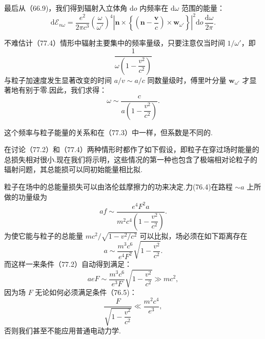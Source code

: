 最后从（66.9)，我们得到辐射入立体角 $\mathrm{d}o$ 内频率在 $\mathrm{d}\omega$ 范围的能量：
\begin{equation}
  \mathrm{d}\mathcal{E}_{n\omega}=\frac{e^2}{2\pi c^3}\left(\frac{\omega}{\omega'}\right)^{\!4}
  \left|\boldsymbol{n}\times\left\{\left(\boldsymbol{n}-\frac{\boldsymbol{v}}{c}\right)\times\boldsymbol{w}_{\omega'}\right\}\right|^2
  \mathrm{d}o\,\frac{\mathrm{d}\omega}{2\pi}.
\end{equation}

不难估计（77.4）情形中辐射主要集中的频率量级，只要注意仅当时间 $1/\omega'$，即
\begin{equation*}
  \frac{1}{\omega\left(1-\dfrac{v^2}{c^2}\right)}
\end{equation*}
与粒子加速度发生显著改变的时间 $a/v\sim a/c$ 同数量级时，傅里叶分量 $\boldsymbol{w}_{\omega'}$ 才显著地有别于零.因此，我们求得：
\begin{equation}
  \omega\sim\frac{c}{a\left(1-\dfrac{v^2}{c^2}\right)}.
\end{equation}

这个频率与粒子能量的关系和在（77.3）中一样，但系数是不同的.

在讨论（77.2）和（77.4）两种情形时都作了如下假设，即粒子在穿过场时能量的总损失相对很小.现在我们将示明，这些情况的第一种也包含了极端相对论粒子的辐射问题，其总能损可以同初始能量相比拟.

粒子在场中的总能量损失可以由洛伦兹摩擦力的功来决定.力(76.4)在路程 $\sim a$ 上所做的功量级为
\begin{equation*}
  af\sim\frac{e^4F^2a}{m^2c^4\left(1-\dfrac{v^2}{c^2}\right)}.
\end{equation*}
为使它能与粒子的总能量 $mc^2/\sqrt{1-v^2/c^2}$ 可以比拟，场必须在如下距离存在
\begin{equation*}
  a\sim\frac{m^3c^6}{e^4F^2}\sqrt{1-\frac{v^2}{c^2}}.
\end{equation*}
而这样一来条件（77.2）自动得到满足：
\begin{equation*}
  aeF\sim\frac{m^3c^6}{e^3F}\sqrt{1-\frac{v^2}{c^2}}\gg mc^2,
\end{equation*}
因为场 $F$ 无论如何必须满足条件（76.5)：
\begin{equation*}
  \frac{F}{\sqrt{1-\dfrac{v^2}{c^2}}}\ll\frac{m^2c^4}{e^3},
\end{equation*}
否则我们甚至不能应用普通电动力学.

